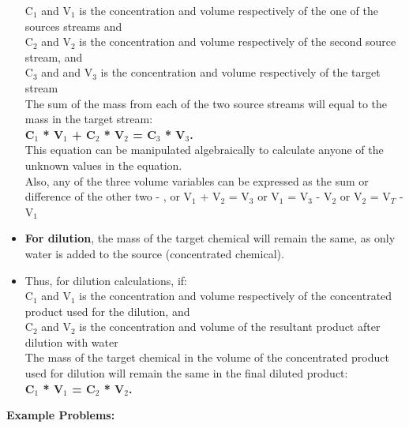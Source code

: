 \begin{itemize}
C$_1$ and V$_1$ is the concentration and volume respectively of the one of the sources streams and\\
\vspace{0.2cm}
 C$_2$ and V$_2$ is the concentration and volume respectively of the second source stream, and \\
 \vspace{0.2cm}
C$_3$ and and V$_3$ is the concentration and volume respectively of the target stream\\
\vspace{0.3cm}
The sum of the mass from each of the two source streams will equal to the mass in the target stream:\\
\vspace{0.3cm}
\textbf{C$_1$ * V$_1$ + C$_2$ * V$_2$ =  C$_3$ * V$_3$.}\\
\vspace{0.3cm}
This equation can be manipulated algebraically to calculate anyone of the unknown values in the equation.\\
\vspace{0.2cm}
Also, any of the three volume variables can be expressed as the sum or difference of the other two - , or V$_1$ + V$_2$ = V$_3$ or V$_1$ = V$_3$ - V$_2$ or V$_2$ = V$_T$ - V$_1$\\

\item \textbf{For dilution}, the mass of the target chemical will remain the same, as only water is added to the source (concentrated chemical).
\item Thus, for dilution calculations, if:\\
\vspace{0.2cm}
C$_1$ and V$_1$ is the concentration and volume respectively of the concentrated product used for the dilution, and\\
\vspace{0.2cm}
C$_2$ and V$_2$ is the concentration and volume of the resultant product after dilution with water\\
\vspace{0.2cm}
The mass of the target chemical in the volume of the concentrated product used for dilution will remain the same in the final diluted product:\\
\vspace{0.3cm}
\textbf{C$_1$ * V$_1$ =  C$_2$ * V$_2$.}\\

\end{itemize}
\textbf{Example Problems:}\\

